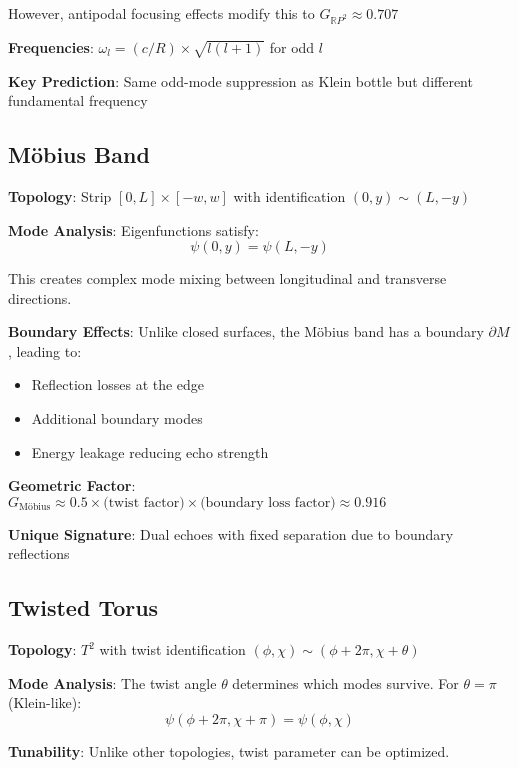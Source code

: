 \documentclass[11pt,a4paper]{article}
\begin{document}
However, antipodal focusing effects modify this to $G_{\mathbb{R}P^2} \approx 0.707$

\textbf{Frequencies}: $\omega_l = (c/R) \times \sqrt{l(l+1)}$ for odd $l$

\textbf{Key Prediction}: Same odd-mode suppression as Klein bottle but different fundamental frequency

\subsection{Möbius Band}

\textbf{Topology}: Strip $[0,L] \times [-w,w]$ with identification $(0,y) \sim (L,-y)$

\textbf{Mode Analysis}: Eigenfunctions satisfy:
\begin{equation}
\psi(0,y) = \psi(L,-y)
\end{equation}

This creates complex mode mixing between longitudinal and transverse directions.

\textbf{Boundary Effects}: Unlike closed surfaces, the Möbius band has a boundary $\partial M$, leading to:
\begin{itemize}
    \item Reflection losses at the edge
    \item Additional boundary modes
    \item Energy leakage reducing echo strength
\end{itemize}

\textbf{Geometric Factor}: $G_{\text{Möbius}} \approx 0.5 \times \text{(twist factor)} \times \text{(boundary loss factor)} \approx 0.916$

\textbf{Unique Signature}: Dual echoes with fixed separation due to boundary reflections

\subsection{Twisted Torus}

\textbf{Topology}: $T^2$ with twist identification $(\phi, \chi) \sim (\phi + 2\pi, \chi + \theta)$

\textbf{Mode Analysis}: The twist angle $\theta$ determines which modes survive. For $\theta = \pi$ (Klein-like):
\begin{equation}
\psi(\phi + 2\pi, \chi + \pi) = \psi(\phi, \chi)
\end{equation}

\textbf{Tunability}: Unlike other topologies, twist parameter can be optimized.
\end{document}
